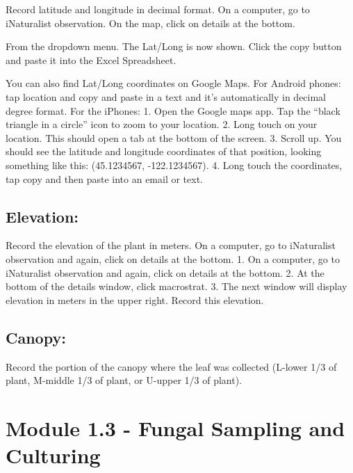 \documentclass[
  letterpaper,
  DIV=11,
  numbers=noendperiod]{scrreprt}
\begin{document}
Record latitude and longitude in decimal format. On a computer, go to
iNaturalist observation. On the map, click on details at the bottom.

From the dropdown menu. The Lat/Long is now shown. Click the copy button
and paste it into the Excel Spreadsheet.

You can also find Lat/Long coordinates on Google Maps. For Android
phones: tap location and copy and paste in a text and it's automatically
in decimal degree format. For the iPhones: 1. Open the Google maps app.
Tap the ``black triangle in a circle'' icon to zoom to your location. 2.
Long touch on your location. This should open a tab at the bottom of the
screen. 3. Scroll up. You should see the latitude and longitude
coordinates of that position, looking something like this: (45.1234567,
-122.1234567). 4. Long touch the coordinates, tap copy and then paste
into an email or text.

\subsection*{Elevation:}\label{elevation}

Record the elevation of the plant in meters. On a computer, go to
iNaturalist observation and again, click on details at the bottom. 1. On
a computer, go to iNaturalist observation and again, click on details at
the bottom. 2. At the bottom of the details window, click macrostrat. 3.
The next window will display elevation in meters in the upper right.
Record this elevation.

\subsection*{Canopy:}\label{canopy}

Record the portion of the canopy where the leaf was collected (L-lower
1/3 of plant, M-middle 1/3 of plant, or U-upper 1/3 of plant).

\section*{Module 1.3 - Fungal Sampling and
Culturing}\label{module-1.3---fungal-sampling-and-culturing}

\end{document}
